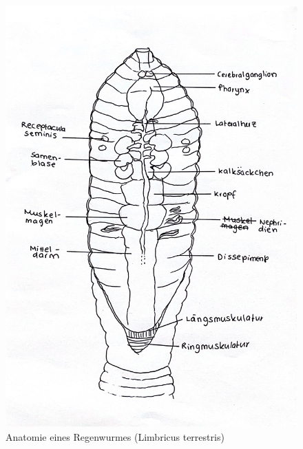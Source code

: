 \documentclass[oneside,10pt,a4paper]{report}
\begin{document}
		\begin{figure}[H]
			\centering
			\includegraphics[scale=0.25]{Regenwurm.JPG}
			\caption{Anatomie eines Regenwurmes (Limbricus terrestris)}
			\label{fig:Regenwurm_ana}
		\end{figure}
		
		
		
		
	
	\nocite{*}
	
	\newpage
\end{document}
